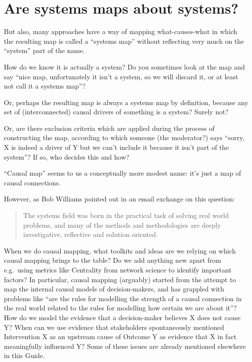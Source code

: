 \documentclass[
]{book}
\begin{document}
\hypertarget{are-systems-maps-about-systems}{%
\section{Are systems maps about systems?}\label{are-systems-maps-about-systems}}

But also, many approaches have a way of mapping what-causes-what in which the resulting map is called a ``systems map'' without reflecting very much on the ``system'' part of the name.

How do we know it is actually a system? Do you sometimes look at the map and say ``nice map, unfortunately it isn't a system, so we will discard it, or at least not call it a systems map''?

Or, perhaps the resulting map is always a systems map by definition, because any set of (interconnected) causal drivers of something is a system? Surely not?

Or, are there exclusion criteria which are applied during the process of constructing the map, according to which someone (the moderator?) says ``sorry, X is indeed a driver of Y but we can't include it because it isn't part of the system''? If so, who decides this and how?

``Causal map'' seems to us a conceptually more modest name: it's just a map of causal connections.

However, as Bob Williams pointed out in an email exchange on this question:

\begin{quote}
The systems field was born in the practical task of solving real world problems, and many of the methods and methodologies are deeply investigative, reflective and solution oriented.
\end{quote}

When we do causal mapping, what toolkits and ideas are we relying on which causal mapping brings to the table? Do we add anything new apart from e.g.~using metrics like Centrality from network science to identify important factors? In particular, causal mapping (arguably) started from the attempt to map the internal causal models of decision-makers, and has grappled with problems like ``are the rules for modelling the strength of a causal connection in the real world related to the rules for modelling how certain we are about it''? How do we model the evidence that a decision-maker believes X does not cause Y? When can we use evidence that stakeholders spontaneously mentioned Intervention X as an upstream cause of Outcome Y as evidence that X in fact meaningfully influenced Y? Some of these issues are already mentioned elsewhere in this Guide.
\end{document}
